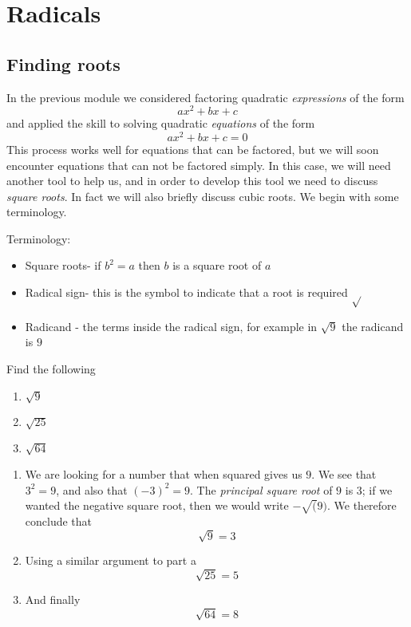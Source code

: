 \chapter{Radicals}
\minitoc
\section{Finding roots}
%
In the previous module we considered factoring \gls{quadratic} {\em expressions} of the form
\[
	ax^2+bx+c
\]
and applied the skill to solving quadratic {\em equations} of the form
\[
	ax^2+bx+c=0
\]
This process works well for equations that can be factored, but we will soon encounter
equations that can not be factored simply. In this case, we will need another tool to help
us, and in order to develop this tool we need to discuss {\em square roots}. In fact
we will also briefly discuss cubic roots. We begin with some terminology.

\begin{myDefinition}
	Terminology:
	\begin{itemize}
		\item Square roots- if $b^2=a$ then $b$ is a square root of $a$
		\item Radical sign- this is the symbol to indicate that a root is required $\sqrt{}$
		\item Radicand - the terms inside the radical sign, for example in $\sqrt{9}$ the radicand is $9$
	\end{itemize} 
	{}
\end{myDefinition} 

\begin{myexample}
Find the following
\begin{multicols}{3}
	\begin{enumerate}
		\item $\sqrt{9}$
		\item $\sqrt{25}$
		\item $\sqrt{64}$
	\end{enumerate} 
\end{multicols}
\end{myexample}
\begin{myProof}
	\begin{enumerate}
		\item We are looking for a number that when squared gives us $9$. We see that $3^2=9$, and also that
		$(-3)^2=9$. The {\em principal square root} of $9$ is 3; if we wanted the negative square root, then
		we would write $-\sqrt(9)$. We therefore conclude that
		\[
			\sqrt{9}=3
		\]
		\item Using a similar argument to part a
		\[
			\sqrt{25} = 5
		\]
		\item And finally
		\[
			\sqrt{64} = 8
		\]
	\end{enumerate} 
\end{myProof} 

